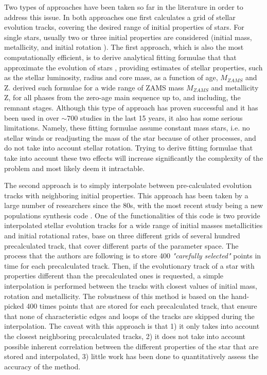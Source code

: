 \documentclass[preprint]{aastex}
\begin{document}
Two types of approaches have been taken so far in the literature in order to address this issue. In both approaches one first calculates a grid of stellar evolution tracks, covering the desired range of initial properties of stars. For single stars, usually two or three initial properties are considered (initial mass, metallicity, and initial rotation ). The first approach, which is also the most computationally efficient, is to derive analytical fitting formulae that that approximate the evolution of stars , providing estimates of stellar properties, such as the stellar luminosity, radius and core mass, as a function of age, $M_{ZAMS}$ and Z. \citet{Hurley2000} derived such formulae for a wide range of ZAMS mass $M_{ZAMS}$ and metallicity Z, for all phases from the zero-age main sequence up to, and including, the remnant stages. Although this type of approach has proven successful and it has been used in over $\sim 700$ studies in the last 15 years, it also has some serious limitations. Namely, these fitting formulae assume constant mass stars, i.e. no stellar winds or readjusting the mass of the star because of other processes, and do not take into account stellar rotation. Trying to derive fitting formulae that take into account these two effects will increase significantly the complexity of the problem and most likely deem it intractable.

The second approach is to simply interpolate between pre-calculated evolution tracks with neighboring initial properties. This approach has been taken by a large number of researchers since the 80s, with the most recent study being a new populations synthesis code \citep{2014A&A...566A..21G}. One of the functionalities of this code is two provide interpolated stellar evolution tracks for a wide range of initial masses metallicities and initial rotational rates, base on three different grids of several hundred precalculated track, that cover different parts of the parameter space. The process that the authors are following is to store 400 \textit{"carefully selected"} points in time for each precalculated track. Then, if the evolutionary track of a star with properties different than the precalculated ones is requested, a simple interpolation is performed between the tracks with closest values of initial mass, rotation and metallicity. The robustness of this method is based on the hand-picked 400 times points that are stored for each precalculated track, that ensure that none of characteristic edges and loops of the tracks are skipped during the interpolation. The caveat with this approach is that 1) it only takes into account the closest neighboring precalculated tracks, 2) it does not take into account possible inherent correlation between the different properties of the star that are stored and interpolated, 3) little work has been done to quantitatively assess the accuracy of the method.
\end{document}
